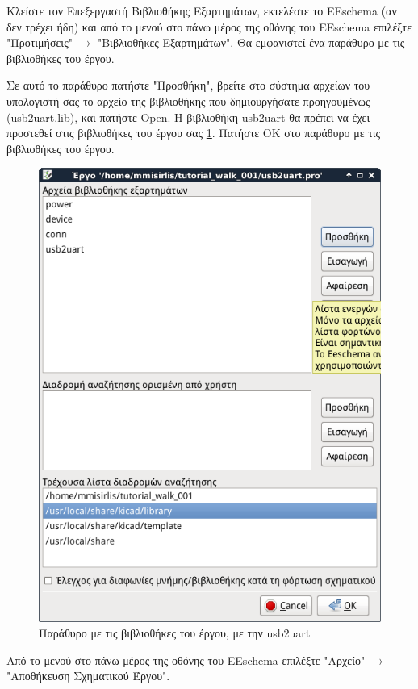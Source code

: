 \documentclass[a4paper]{article}
\begin{document}
Κλείστε τον Επεξεργαστή Βιβλιοθήκης Εξαρτημάτων, εκτελέστε το \textenglish{EEschema} (αν δεν τρέχει ήδη) και από το μενού στο πάνω μέρος της οθόνης του \textenglish{EEschema} επιλέξτε "Προτιμήσεις" $\rightarrow$ "Βιβλιοθήκες Εξαρτημάτων". Θα εμφανιστεί ένα παράθυρο με τις βιβλιοθήκες του έργου. 

Σε αυτό το παράθυρο πατήστε "Προσθήκη", βρείτε στο σύστημα αρχείων του υπολογιστή σας το αρχείο της βιβλιοθήκης που δημιουργήσατε προηγουμένως (\textenglish{usb2uart.lib}), και πατήστε Open. Η βιβλιοθήκη usb2uart θα πρέπει να έχει προστεθεί στις βιβλιοθήκες του έργου σας \ref{fig:libed-dial-libs}. Πατήστε ΟΚ στο παράθυρο με τις βιβλιοθήκες του έργου.

\begin{figure}
  \begin{center}
    \includegraphics[width=.9\textwidth]{img/libed-dial-libs.png}
    \caption{Παράθυρο με τις βιβλιοθήκες του έργου, με την usb2uart}
    \label{fig:libed-dial-libs}
  \end{center}
\end{figure}

Από το μενού στο πάνω μέρος της οθόνης του \textenglish{EEschema} επιλέξτε "Αρχείο" $\rightarrow$ "Αποθήκευση Σχηματικού Έργου".
\end{document}

